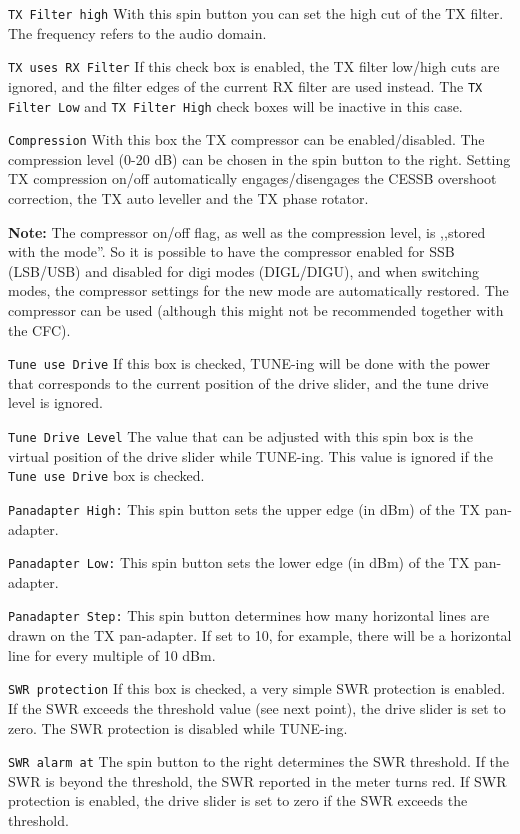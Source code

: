 \documentclass[12pt]{book}
\def\rett#1{\texttt{\color{red}#1}}
\begin{document}
\rett{TX Filter high} With this spin button you can set the high cut of the TX filter. The
frequency refers to the audio domain.

\rett{TX uses RX Filter} If this check box is enabled, the TX filter low/high cuts are ignored,
and the filter edges of the current RX filter are used instead. The \rett{TX Filter Low}
and \rett{TX Filter High} check boxes will be inactive in this case.

\rett{Compression} With this box the TX compressor can be enabled/disabled.
The compression level (0-20 dB) can be chosen in the spin button to the right.
Setting TX compression on/off automatically engages/disengages the CESSB overshoot
correction, the TX auto leveller and the TX phase rotator.

\textbf{Note:} The compressor on/off flag, as well as the compression level, is
,,stored with the mode''. So it is possible to have the compressor enabled for SSB
(LSB/USB)
and disabled for digi modes (DIGL/DIGU), and when switching modes, the compressor
settings for the new mode are automatically restored. The compressor can be used (although
this might not be recommended together with the CFC).

\rett{Tune use Drive} If this box is checked, TUNE-ing will be done with the power that corresponds to the
current position of the drive slider, and the tune drive level is ignored.

\rett{Tune Drive Level} The value that can be adjusted with this spin box is the virtual position of the
drive slider while TUNE-ing. This value is ignored if the \rett{Tune use Drive} box is checked.

\rett{Panadapter High:} This spin button sets the upper edge (in dBm) of the TX pan-adapter.

\rett{Panadapter Low:} This spin button sets the lower edge (in dBm) of the TX pan-adapter.

\rett{Panadapter Step:} This spin button determines how many horizontal lines are drawn on the
TX pan-adapter. If set to 10, for example, there will be a horizontal line for every multiple
of 10 dBm.

\rett{SWR protection} If this box is checked, a very simple SWR protection is enabled. If the SWR exceeds
the threshold value (see next point), the drive slider is set to zero. The SWR protection is disabled
while TUNE-ing.

\rett{SWR alarm at} The spin button to the right determines the SWR threshold. If the SWR is beyond the
threshold, the SWR reported in the meter turns red. If SWR protection is enabled, the drive slider is set to
zero if the SWR exceeds the threshold.
\end{document}
